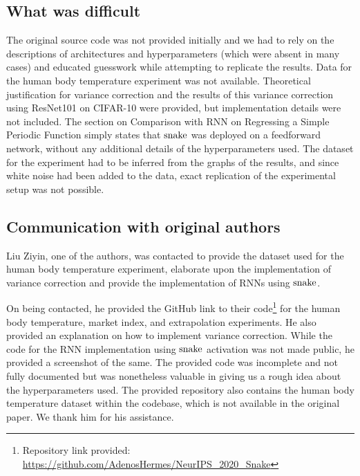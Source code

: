 \subsection{What was difficult}

The original source code was not provided initially and we had to rely on the descriptions of architectures and hyperparameters (which were absent in many cases) and educated guesswork while attempting to replicate the results. 
Data for the human body temperature experiment was not available. 
Theoretical justification for variance correction and the results of this variance correction using ResNet101 on CIFAR-10 were provided, but implementation details were not included. 
The section on Comparison with RNN on Regressing a Simple Periodic Function simply states that $ \operatorname{snake} $ was deployed on a feedforward network, without any additional details of the hyperparameters used. The dataset for the experiment had to be inferred from the graphs of the results, and since white noise had been added to the data, exact replication of the experimental setup was not possible.

\subsection{Communication with original authors}

Liu Ziyin, one of the authors, was contacted to provide the dataset used for the human body temperature experiment, elaborate upon the implementation of variance correction and provide the implementation of RNNs using $ \operatorname{snake} $.

On being contacted, he provided the GitHub link to their code\footnote{Repository link provided: \url{https://github.com/AdenosHermes/NeurIPS_2020_Snake}} for the human body temperature, market index, and extrapolation experiments. He also provided an explanation on how to implement variance correction. While the code for the RNN implementation using $ \operatorname{snake} $ activation was not made public, he provided a screenshot of the same. The provided code was incomplete and not fully documented but was nonetheless valuable in giving us a rough idea about the hyperparameters used. The provided repository also contains the human body temperature dataset within the codebase, which is not available in the original paper. We thank him for his assistance. 